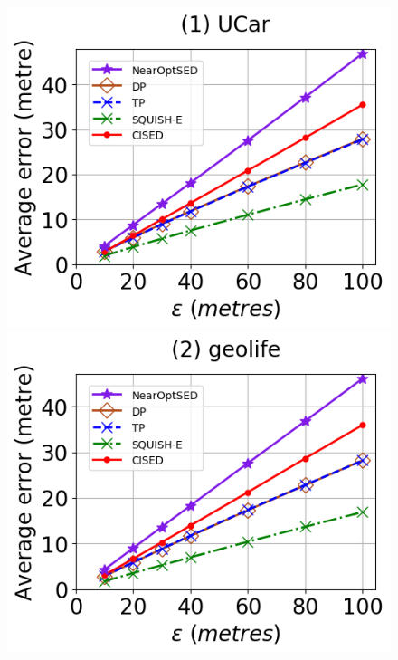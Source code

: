 \begin{figure}[tb!]
	\centering
	\includegraphics[scale=0.315]{Figures/Exp-SED-error-epsilon-service.png}	\hspace{1ex}
	\includegraphics[scale=0.315]{Figures/Exp-SED-error-epsilon-geolife.png}	\hspace{1ex}

\end{figure}
